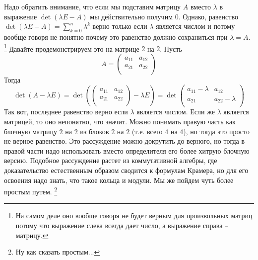 Надо обратить внимание, что если мы подставим матрицу $A$ вместо $\lambda$ в выражение $\det(\lambda E - A)$ мы действительно получим $0$.
Однако, равенство $\det(\lambda E - A) = \sum_{k = 0}^n \lambda^k$ верно только если $\lambda$ является числом и потому вообще говоря не понятно почему это равенство должно сохраниться при $\lambda = A$.%
\footnote{На самом деле оно вообще говоря не будет верным для произвольных матриц потому что выражение слева всегда дает число, а выражение справа -- матрицу.}
Давайте продемонстрируем это на матрице $2$ на $2$.
Пусть
\[
A = 
\begin{pmatrix}
{a_{11}}&{a_{12}}\\
{a_{21}}&{a_{22}}\\
\end{pmatrix}
\]
Тогда
\[
\det(A-\lambda E) =
\det
\left(
\begin{pmatrix}
{a_{11}}&{a_{12}}\\
{a_{21}}&{a_{22}}\\
\end{pmatrix}
-\lambda E
\right)=
\det 
\begin{pmatrix}
{a_{11}-\lambda}&{a_{12}}\\
{a_{21}}&{a_{22}-\lambda}\\
\end{pmatrix}
\]
Так вот, последнее равенство верно если $\lambda$ является числом.
Если же $\lambda$ является матрицей, то оно непонятно, что значит.
Можно понимать правую часть как блочную матрицу $2$ на $2$ из блоков $2$ на $2$ (т.е. всего $4$ на $4$), но тогда это просто не верное равенство.
Это рассуждение можно докрутить до верного, но тогда в правой части надо использовать вместо определителя его более хитрую блочную версию.
Подобное рассуждение растет из коммутативной алгебры, где доказательство естественным образом сводится к формулам Крамера, но для его освоения надо знать, что такое кольца и модули.
Мы же пойдем чуть более простым путем.%
\footnote{Ну как сказать простым...}

